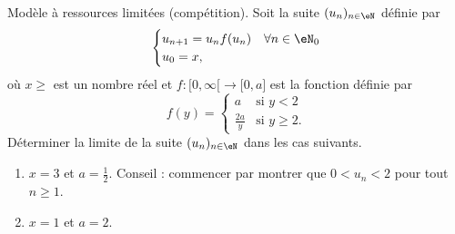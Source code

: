 
\begin{exercice}\label{exoTD3-0007}

	Modèle à ressources limitées (compétition). Soit la suite $(u_n)_{n\in\eN}$ définie par
	\begin{equation}
		\begin{cases}
			u_{n+1}=u_nf(u_n)	&	\text{$\forall n\in \eN_0$}\\
			u_0=x,
		\end{cases}
	\end{equation}
	où $x\geq$ est un nombre réel et $f\colon \mathopen[ 0 , \infty [\to \mathopen[ 0 , a \mathclose]$ est la fonction définie par
	\begin{equation}
		f(y)=\begin{cases}
			a	&	\text{si $y<2$}\\
			\frac{ 2a }{ y }	&	 \text{si $y\geq 2$}.
		\end{cases}
	\end{equation}
	Déterminer la limite de la suite $(u_n)_{n\in\eN}$ dans les cas suivants.
	\begin{enumerate}
		\item
			$x=3$ et $a=\frac{1}{ 2 }$. Conseil : commencer par montrer que $0<u_n<2$ pour tout $n\geq 1$.
		\item
			$x=1$ et $a=2$.
	\end{enumerate}

\end{exercice}
